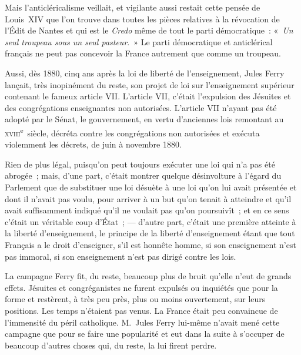 \documentclass[french,twoside]{book} %
\newcommand{\astertri}{\medskip\par\centerline{\color{rubric}\large\selectfont{\syms ✻\,✻\,✻}}\medskip\par}%
\begin{document}
Mais l’anticléricalisme veillait, et vigilante aussi restait cette pensée de Louis XIV que l’on trouve dans toutes les pièces relatives à la révocation de l’Édit de Nantes et qui est le {\itshape Credo} même de tout le parti démocratique : « {\itshape Un seul troupeau sous un  seul pasteur}. » Le parti démocratique et anticlérical français ne peut pas concevoir la France autrement que comme un troupeau.\par
Aussi, dès 1880, cinq ans après la loi de liberté de l’enseignement, Jules Ferry lançait, très inopinément du reste, son projet de loi sur l’enseignement supérieur contenant le fameux article VII. L’article VII, c’était l’expulsion des Jésuites et des congrégations enseignantes non autorisées. L’article VII n’ayant pas été adopté par le Sénat, le gouvernement, en vertu d’anciennes lois remontant au \textsc{xviii}\textsuperscript{e} siècle, décréta contre les congrégations non autorisées et exécuta violemment les décrets, de juin à novembre 1880.\par
Rien de plus légal, puisqu’on peut toujours exécuter une loi qui n’a pas été abrogée ; mais, d’une part, c’était montrer quelque désinvolture à l’égard du Parlement que de substituer une loi désuète à une loi qu’on lui avait présentée et dont il n’avait pas voulu, pour arriver à un but qu’on tenait à atteindre et qu’il avait suffisamment indiqué qu’il ne voulait pas qu’on poursuivît ; et en ce sens c’était un véritable coup d’État ; — d’autre part, c’était une première atteinte à la liberté d’enseignement, le principe de la liberté d’enseignement étant que tout Français a le droit d’enseigner, s’il est honnête homme, si son enseignement n’est pas immoral,  si son enseignement n’est pas dirigé contre les lois.\par
La campagne Ferry fit, du reste, beaucoup plus de bruit qu’elle n’eut de grands effets. Jésuites et congréganistes ne furent expulsés ou inquiétés que pour la forme et restèrent, à très peu près, plus ou moins ouvertement, sur leurs positions. Les temps n’étaient pas venus. La France était peu convaincue de l’immensité du péril catholique. M. Jules Ferry lui-même n’avait mené cette campagne que pour se faire une popularité et eut dans la suite à s’occuper de beaucoup d’autres choses qui, du reste, la lui firent perdre.\par

\astertri
\end{document}
